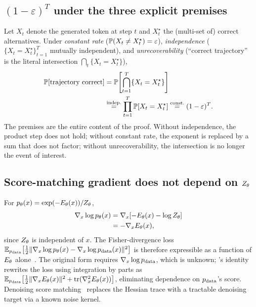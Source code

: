 \subsection{$(1-\varepsilon)^T$ under the three explicit premises}
\label{app:eps_proof}

Let $X_t$ denote the generated token at step $t$ and $X_t^\star$ the (multi-set of) correct alternatives.
Under \emph{constant rate} ($\mathbb{P}(X_t \neq X_t^\star) = \varepsilon$), \emph{independence} ($\{X_t = X_t^\star\}_{t=1}^T$ mutually independent), and \emph{unrecoverability} (``correct trajectory'' is the literal intersection $\bigcap_t \{X_t = X_t^\star\}$),
\begin{align}
  \mathbb{P}[\text{trajectory correct}]
  &= \mathbb{P}\!\left[\bigcap_{t=1}^{T} \{X_t = X_t^\star\}\right] \\
  &\overset{\text{indep.}}{=} \prod_{t=1}^{T} \mathbb{P}[X_t = X_t^\star]
   \overset{\text{const.}}{=} (1-\varepsilon)^T.
\end{align}
The premises are the entire content of the proof.
Without independence, the product step does not hold;
without constant rate, the exponent is replaced by a sum that does not factor;
without unrecoverability, the intersection is no longer the event of interest.

\subsection{Score-matching gradient does not depend on $Z_\theta$}
\label{app:score_proof}

For $p_\theta(x) = \exp(-E_\theta(x))/Z_\theta$,
\begin{align}
  \nabla_x \log p_\theta(x)
  &= \nabla_x \!\left[-E_\theta(x) - \log Z_\theta\right] \\
  &= -\nabla_x E_\theta(x),
\end{align}
since $Z_\theta$ is independent of $x$.
The Fisher-divergence loss $\mathbb{E}_{p_{\mathrm{data}}}\!\left[\tfrac{1}{2} \|\nabla_x \log p_\theta(x) - \nabla_x \log p_{\mathrm{data}}(x)\|^2\right]$ is therefore expressible as a function of $E_\theta$ alone~\citep{hyvarinen2005score}.
The original form requires $\nabla_x \log p_{\mathrm{data}}$, which is unknown;
\citet{hyvarinen2005score}'s identity rewrites the loss using integration by parts as $\mathbb{E}_{p_{\mathrm{data}}}\!\left[\tfrac{1}{2}\|\nabla_x E_\theta(x)\|^2 + \mathrm{tr}(\nabla_x^2 E_\theta(x))\right]$, eliminating dependence on $p_{\mathrm{data}}$'s score.
Denoising score matching~\citep{vincent2011connection} replaces the Hessian trace with a tractable denoising target via a known noise kernel.
